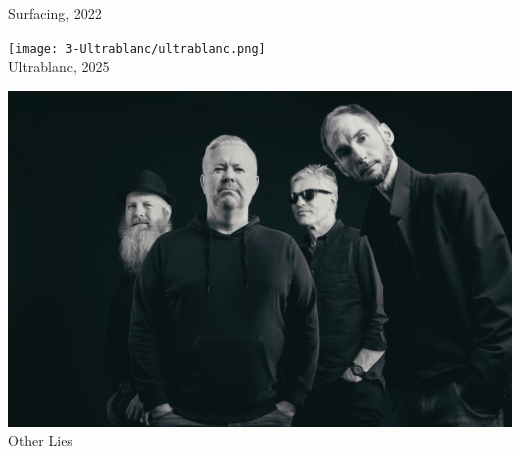 \begin{titlepage}
\begin{minipage}[t]{0.5\textwidth}
    {\Large \sffamily Surfacing, 2022}
  \end{minipage}
  
  \vspace{2em}
  
  \begin{minipage}[t]{0.5\textwidth}
    \centering
    \texttt{[image: 3-Ultrablanc/ultrablanc.png]}\\
    {\Large \sffamily Ultrablanc, 2025}
  \end{minipage}%
  \begin{minipage}[t]{0.5\textwidth}
    \centering
    \includegraphics[height=0.25\textheight]{Other-Lies-Band.jpeg}\\
    {\LARGE \sffamily Other Lies}
  \end{minipage}%
\end{titlepage}

